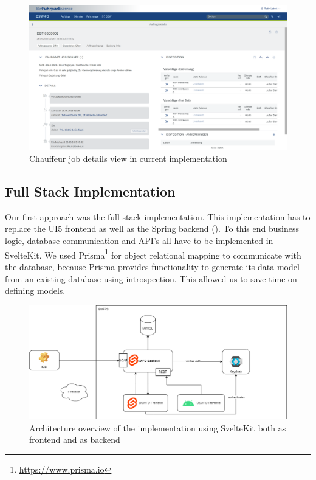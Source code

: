 \begin{figure}
    \centering
    \includegraphics[width=\linewidth]{assets/current-auftrag-details}
    \caption{Chauffeur job details view in current implementation}
    \label{fig:current-details-auftrag}
\end{figure}


\subsection{Full Stack Implementation}

Our first approach was the full stack implementation. This implementation has to replace the UI5 frontend as well as the Spring backend (). To this end business logic, database communication and API's all have to be implemented in SvelteKit. We used Prisma\footnote{\url{https://www.prisma.io}} for object relational mapping to communicate with the database, because Prisma provides functionality to generate its data model from an existing database using introspection. This allowed us to save time on defining models.


\begin{figure}
    \centering
    \includegraphics[width=.8\linewidth]{assets/dswfd-architecture-fullstack}
    \caption{Architecture overview of the implementation using SvelteKit both as frontend and as backend}
    \label{fig:dswfd-architecture-fullstack}
\end{figure}

